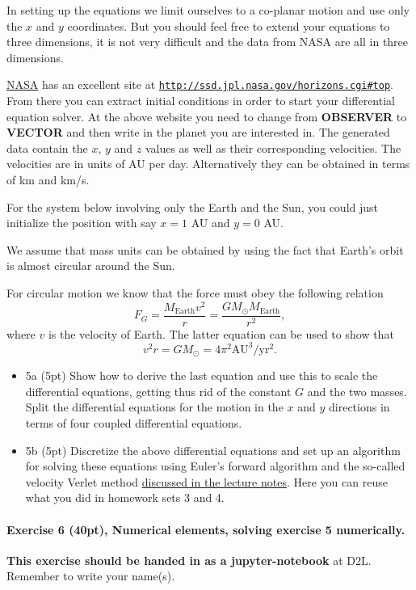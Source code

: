 \documentclass[%
oneside,                 %
final,                   %
10pt]{article}
\begin{document}
In setting up the equations we limit ourselves to a co-planar
motion and use only the $x$ and $y$ coordinates. But you should feel
free to extend your equations to three dimensions, it is not very
difficult and the data from NASA are all in three dimensions.

\href{{http://www.nasa.gov/index.html}}{NASA} has an excellent site at \href{{http://ssd.jpl.nasa.gov/horizons.cgi#top}}{\nolinkurl{http://ssd.jpl.nasa.gov/horizons.cgi\#top}}.
From there you can extract initial conditions in order to start your differential equation solver.
At the above website you need to change from \textbf{OBSERVER} to \textbf{VECTOR} and then write in the planet you are interested in.
The generated data contain the $x$, $y$ and $z$ values as well as their corresponding velocities. The velocities are in units of AU per day.
Alternatively they can be obtained in terms of km and km/s. 

For the system below involving only the Earth and the Sun, you
could just initialize the position with say $x=1$ AU and $y=0$ AU.

We assume that mass units can be obtained by using the fact that
Earth's orbit is almost circular around the Sun.

For circular motion we know that the force must obey the following relation
\[
F_G= \frac{M_{\mathrm{Earth}}v^2}{r}=\frac{GM_{\odot}M_{\mathrm{Earth}}}{r^2},
\]
where $v$ is the velocity of Earth. 
The latter equation can be used to show that
\[
v^2r=GM_{\odot}=4\pi^2\mathrm{AU}^3/\mathrm{yr}^2.
\]
\begin{itemize}
\item 5a (5pt) Show how to derive the last equation and use this to scale the differential equations, getting thus rid of the constant $G$ and the two masses. Split the differential equations for the motion in the $x$ and $y$ directions in terms of four coupled differential equations.

\item 5b (5pt)  Discretize the above differential equations and set up an algorithm for solving these equations using Euler's forward algorithm and the so-called velocity Verlet method \href{{https://mhjensen.github.io/Physics321/doc/pub/week7/html/week7.html}}{discussed in the lecture notes}. Here you can reuse what you did in homework sets 3 and 4.
\end{itemize}

\noindent
\paragraph{Exercise 6 (40pt), Numerical elements, solving exercise 5 numerically.}
\textbf{This exercise should be handed in as a jupyter-notebook} at D2L. Remember to write your name(s). 
\end{document}
